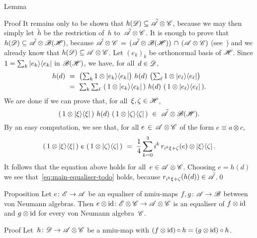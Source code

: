 \documentclass[a]{subfiles}
\begin{document}
\begin{parsec}
\begin{point}{Lemma}
\begin{point}{Proof}
It remains only to 
be shown that $h(\mathscr{D}) \subseteq \tilde{\mathscr{A}}\otimes \mathscr{C}$,
because we may then simply let~$\tilde{h}$
be the restriction of~$h$ to~$\tilde{\mathscr{A}}\otimes \mathscr{C}$.
It is enough to prove that
$h(\mathscr{D}) \subseteq \tilde{\mathscr{A}} 
\otimes  \mathscr{B}(\mathscr{H})$,
because 
$\tilde{\mathscr{A}} \otimes  \mathscr{C}
\,=\, (\tilde{\mathscr{A}}\otimes \mathscr{B}(\mathscr{H}))\,\cap\,
(\mathscr{A}\otimes \mathscr{C})$
(see~)
and we already know that $h(\mathscr{D})\subseteq \mathscr{A}\otimes \mathscr{C}$.
Let $(e_k)_k$ be orthonormal basis of $\mathscr{H}$.
Since $1= \sum_k \ket{e_k}\!\bra{e_k}$
in $\mathscr{B}(\mathscr{H})$,
we have, for all~$d\in\mathscr{D}$,
\begin{align*}
h(d) \ &=\ \textstyle\bigl(\sum_k 1\otimes \ket{e_k}\!\bra{e_k}\bigr)
\ h(d)\ \bigl(\sum_\ell 1\otimes \ket{e_\ell}\!\bra{e_\ell}\bigr)\\
\ &=\ \textstyle \sum_k\sum_\ell\ 
 (\,1\otimes \ket{e_k}\!\bra{e_k}\,) \ h(d)\  
 (\,1\otimes \ket{e_\ell}\!\bra{e_\ell}\,).
\end{align*}
We are done
if we can prove that,
for all~$\xi,\zeta\in\mathscr{H}$,
\begin{equation}
\label{eq:main-equaliser-todo}
(\,1\otimes \ket{\xi}\!\bra{\xi}\,) \ 
h(d)\  (\,1\otimes \ket{\zeta}\!\bra{\zeta}\,)
\ \in\ \tilde\scrA\otimes \bsp(\scrH).
\end{equation}
By an easy computation, we see that,
for all $e \,\in\,\mathscr{A}\otimes \mathscr{C}$
	of the form $e\equiv a\otimes c$,
\begin{equation*}
\label{eq:polarisation-equaliser}
(\,1\otimes \ket{\xi}\!\bra{\xi}\,) \ e
\  (\,1\otimes \ket{\zeta}\!\bra{\zeta}\,)
\ =\ 
\frac{1}{4}\sum_{k=0}^3i^k \,r_{i^k\xi+\zeta}(e)\otimes \ket\xi\!\bra\zeta.
\end{equation*}
It follows that the equation above holds for all~$e\in \mathscr{A}\otimes \mathscr{C}$.
Choosing $e=h(d)$
we see that~\eqref{eq:main-equaliser-todo}
holds,
because
$r_{i^k\xi+\zeta}(h(d)) \in\tilde{\mathscr{A}}$.\qed
\end{point}
\end{point}
\begin{point}{Proposition}%
Let $e\colon\mathscr{E}\to\mathscr{A}$ be an equaliser of
nmiu-maps $f,g\colon\mathscr{A}\to\mathscr{B}$ 
between von Neumann algebras.
Then $e\otimes\operatorname{id}\colon\mathscr{E}\otimes\mathscr{C}\to\mathscr{A}\otimes\mathscr{C}$
is an equaliser of 
$f\otimes\operatorname{id}$ and $g\otimes\operatorname{id}$
for every von Neumann algebra~$\mathscr{C}$.
\begin{point}{Proof}%
Let~$h\colon\mathscr{D}\to\mathscr{A}\otimes \mathscr{C}$
be a nmiu-map 
with $(f\otimes\operatorname{id})\circ h=(g\otimes\operatorname{id})\circ h$.

\end{point}
\end{point}
\end{parsec}
\end{document}
